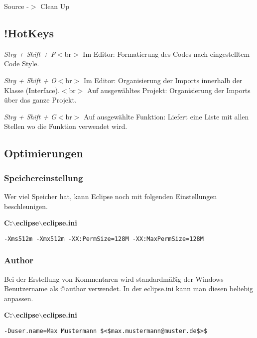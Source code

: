 \documentclass[a4paper,11pt]{article}
\begin{document}
Source -$>$ Clean Up

\subsection{!HotKeys}\textit{Strg + Shift + F}$<$br$>$
Im Editor: Formatierung des Codes nach eingestelltem Code Style.

\textit{Strg + Shift + O}$<$br$>$ Im Editor: Organisierung der Imports innerhalb der Klasse (Interface).$<$br$>$ Auf ausgewähltes Projekt: Organisierung der Imports über das ganze Projekt.

\textit{Strg + Shift + G}$<$br$>$ Auf ausgewählte Funktion: Liefert eine Liste mit allen Stellen wo die Funktion verwendet wird.

\subsection{Optimierungen}

\subsubsection{Speichereinstellung}
Wer viel Speicher hat, kann Eclipse noch mit folgenden Einstellungen beschleunigen.

\textbf{C:$\backslash$eclipse$\backslash$eclipse.ini}
\begin{verbatim}
-Xms512m -Xmx512m -XX:PermSize=128M -XX:MaxPermSize=128M\end{verbatim}

\subsubsection{Author}
Bei der Erstellung von Kommentaren wird standardmäßig der Windows Benutzername als @author verwendet. In der eclipse.ini kann man diesen beliebig anpassen.

\textbf{C:$\backslash$eclipse$\backslash$eclipse.ini}
\begin{verbatim}
-Duser.name=Max Mustermann $<$max.mustermann@muster.de$>$\end{verbatim}
\end{document}
